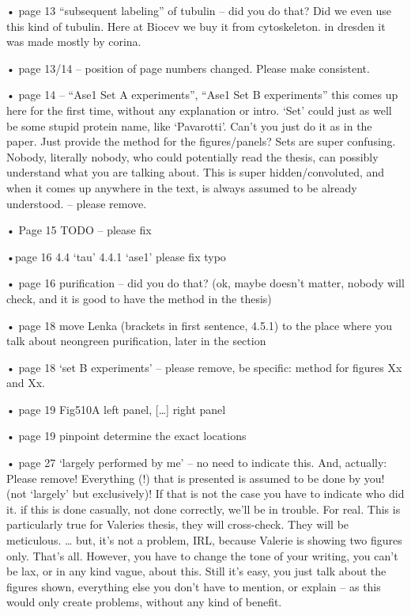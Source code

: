 • page 13 “subsequent labeling” of tubulin – did you do that? Did we even use this kind of tubulin. Here at Biocev we buy it from cytoskeleton. in dresden it was made mostly by corina. 

• page 13/14 – position of page numbers changed. Please make consistent.

• page 14 – “Ase1 Set A experiments”, “Ase1 Set B experiments” this comes up here for the first time, without any explanation or intro. ‘Set’ could just as well be some stupid protein name, like ‘Pavarotti’. Can’t you just do it as in the paper. Just provide the method for the figures/panels? Sets are super confusing. Nobody, literally nobody, who could potentially read the thesis, can possibly understand what you are talking about. This is super hidden/convoluted, and when it comes up anywhere in the text, is always assumed to be already understood. – please remove.

• Page 15 TODO – please fix

•page 16 4.4 ‘tau’ 4.4.1 ‘ase1’ please fix typo

• page 16 purification – did you do that? (ok, maybe doesn’t matter, nobody will check, and it is good to have the method in the thesis)

• page 18 move Lenka (brackets in first sentence, 4.5.1) to the place where you talk about neongreen purification, later in the section

• page 18  ‘set B experiments’ – please remove, be specific: method for figures Xx and Xx.

• page 19 Fig510A left panel, […] right panel

• page 19 pinpoint determine the exact locations

• page 27 ‘largely performed by me’ – no need to indicate this. And, actually: Please remove! Everything (!) that is presented is assumed to be done by you! (not ‘largely’ but exclusively)! If that is not the case you have to indicate who did it. if this is done casually, not done correctly, we’ll be in trouble. For real. This is particularly true for Valeries thesis, they will cross-check. They will be meticulous. … but, it’s not a problem, IRL, because Valerie is showing two figures only. That’s all. However, you have to change the tone of your writing, you can’t be lax, or in any kind vague, about this. Still it’s easy, you just talk about the figures shown, everything else you don’t have to mention, or explain – as this would only create problems, without any kind of benefit.


